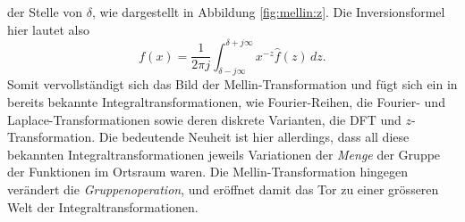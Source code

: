 der Stelle von $\delta$, wie dargestellt in Abbildung 
\ref{fig:mellin:z}.
Die Inversionsformel hier lautet also
\begin{equation}
    f(x) 
    = \frac{1}{2\pi j} 
    \int_{\delta -j\infty}^{\delta +j\infty} 
    x^{-z} \hat{f}(z) \,{d}z
    .
    \label{mellin:mellininv}
\end{equation}
Somit vervollständigt sich das Bild der Mellin-Transformation und fügt 
sich ein in bereits bekannte Integraltransformationen, wie 
Fourier-Reihen, die Fourier- und Laplace-Transformationen sowie deren 
diskrete Varianten, die DFT und $z$-Transformation. 
Die bedeutende Neuheit ist hier allerdings, dass all diese bekannten 
Integraltransformationen jeweils Variationen der {\em Menge} der 
Gruppe der Funktionen im Ortsraum waren.
Die Mellin-Transformation hingegen verändert die 
{\em Gruppenoperation}, und eröffnet damit das Tor zu einer grösseren 
Welt der Integraltransformationen.